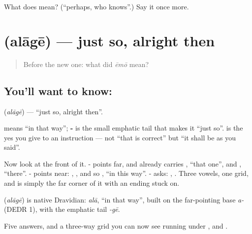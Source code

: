 \begin{tcolorbox}[breakable,colback=teal!4,colframe=teal!35!black,title={Before you move on}]
What does  mean? (\textquotedblleft{}perhaps, who knows\textquotedblright{}.) Say it once more.
\end{tcolorbox}
\section[\texorpdfstring{\te{అలాగే} (alāgē)}{అలాగే (alāgē)}]{ (alāgē) — just so, alright then}

\label{lesson:TE-C49-alright}



\begin{quote}
Before the new one: what did \emph{ēmō} mean?
\end{quote}

\subsection*{You'll want to know: }
\textbf{} (\emph{alāgē}) — \textquotedblleft{}just so, alright then\textquotedblright{}.

 means \textquotedblleft{}in that way\textquotedblright{}; \textbf{-} is the small emphatic tail that makes it \textquotedblleft{}just so\textquotedblright{}.  is the yes you give to an instruction — not \textquotedblleft{}that is correct\textquotedblright{} but \textquotedblleft{}it shall be as you said\textquotedblright{}.

Now look at the front of it. - points far, and already carries , \textquotedblleft{}that one\textquotedblright{}, and , \textquotedblleft{}there\textquotedblright{}. - points near: , , and so , \textquotedblleft{}in this way\textquotedblright{}. - asks: , . Three vowels, one grid, and  is simply the far corner of it with an ending stuck on.

\begin{cousinweb}
\textbf{} (\emph{alāgē}) is native Dravidian: \emph{alā}, \textquotedblleft{}in that way\textquotedblright{}, built on the far-pointing base \emph{a-} (DEDR 1), with the emphatic tail \emph{-gē}.
\end{cousinweb}

\begin{grammarlens}[title={What you've built}]
Five answers, and a three-way grid you can now see running under ,  and .
\end{grammarlens}

